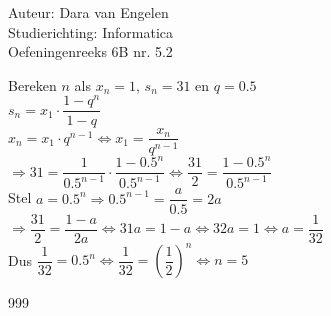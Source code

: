 \documentclass[a4paper]{article}
\begin{document}
	
\noindent \large Auteur: Dara van Engelen     \\
\noindent \large Studierichting: Informatica \\
\noindent \large Oefeningenreeks 6B nr. 5.2 \\
	
\medskip
	
\normalsize

Bereken $n$ als $x_n = 1$, $s_n = 31$ en $q= 0.5$\\

$s_n = x_1 \cdot \dfrac{1-q^n}{1-q}$\\

$x_n = x_1 \cdot q^{n-1} \Leftrightarrow x_1 = \dfrac{x_n}{q^{n-1}}$\\

$\Rightarrow 31 = \dfrac{1}{0.5^{n-1}} \cdot \dfrac{1-0.5^n}{0.5^{n-1}} \Leftrightarrow \dfrac{31}{2} = \dfrac{1-0.5^n}{0.5^{n-1}}$\\

Stel $a = 0.5^n \Rightarrow 0.5^{n-1} = \dfrac{a}{0.5} = 2a$\\

$\Rightarrow \dfrac{31}{2} = \dfrac{1-a}{2a} \Leftrightarrow 31a = 1-a \Leftrightarrow 32a = 1 \Leftrightarrow a = \dfrac{1}{32}$\\

Dus $\dfrac{1}{32} = 0.5^n \Leftrightarrow \dfrac{1}{32} = \left(\dfrac{1}{2}\right)^n \Leftrightarrow n = 5$

\begin{thebibliography}{999}
\end{thebibliography}
\end{document}
